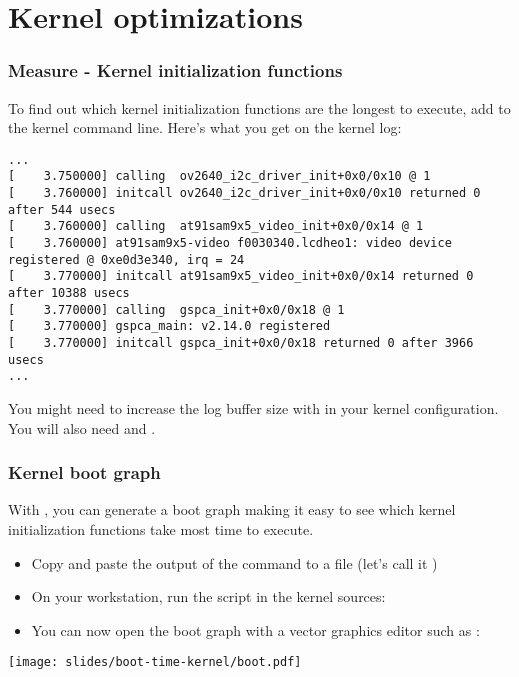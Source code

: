 \section{Kernel optimizations}

\begin{frame}[fragile]
\frametitle{Measure - Kernel initialization functions}
To find out which kernel initialization functions are the longest to
execute, add  to the kernel command line.
Here's what you get on the kernel log:
\begin{block}{}
\tiny
\begin{verbatim}
...
[    3.750000] calling  ov2640_i2c_driver_init+0x0/0x10 @ 1
[    3.760000] initcall ov2640_i2c_driver_init+0x0/0x10 returned 0 after 544 usecs
[    3.760000] calling  at91sam9x5_video_init+0x0/0x14 @ 1
[    3.760000] at91sam9x5-video f0030340.lcdheo1: video device registered @ 0xe0d3e340, irq = 24
[    3.770000] initcall at91sam9x5_video_init+0x0/0x14 returned 0 after 10388 usecs
[    3.770000] calling  gspca_init+0x0/0x18 @ 1
[    3.770000] gspca_main: v2.14.0 registered
[    3.770000] initcall gspca_init+0x0/0x18 returned 0 after 3966 usecs
...
\end{verbatim}
\end{block}
You might need to increase the log buffer size with
 in your kernel configuration. You will
also need  and .
\end{frame}

\begin{frame}
\frametitle{Kernel boot graph}
With , you can generate a boot graph
making it easy to see which kernel initialization functions
take most time to execute.
\begin{itemize}
\item Copy and paste the output of
      the  command to a file (let's call it )
\item On your workstation, run the  script
      in the kernel sources: \\
\item You can now open the boot graph with a vector graphics
      editor such as :
\end{itemize}
\begin{center}
    \texttt{[image: slides/boot-time-kernel/boot.pdf]}
\end{center}
\end{frame}

